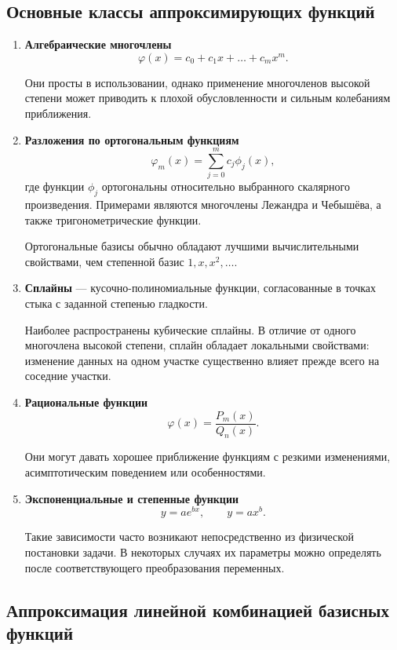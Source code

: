 \subsection{Основные классы аппроксимирующих функций}

\begin{enumerate}
	\item \textbf{Алгебраические многочлены}
	\[
	\varphi(x)
	=
	c_0+c_1x+\ldots+c_mx^m.
	\]
	
	Они просты в использовании, однако применение многочленов высокой степени может приводить к плохой обусловленности и сильным колебаниям приближения.
	
	\item \textbf{Разложения по ортогональным функциям}
	\[
	\varphi_m(x)
	=
	\sum_{j=0}^{m}c_j\phi_j(x),
	\]
	где функции $\phi_j$ ортогональны относительно выбранного скалярного произведения. Примерами являются многочлены Лежандра и Чебышёва, а также тригонометрические функции.
	
	Ортогональные базисы обычно обладают лучшими вычислительными свойствами, чем степенной базис $1,x,x^2,\ldots$.
	
	\item \textbf{Сплайны} --- кусочно-полиномиальные функции, согласованные в точках стыка с заданной степенью гладкости.
	
	Наиболее распространены кубические сплайны. В отличие от одного многочлена высокой степени, сплайн обладает локальными свойствами: изменение данных на одном участке существенно влияет прежде всего на соседние участки.
	
	\item \textbf{Рациональные функции}
	\[
	\varphi(x)=\frac{P_m(x)}{Q_n(x)}.
	\]
	
	Они могут давать хорошее приближение функциям с резкими изменениями, асимптотическим поведением или особенностями.
	
	\item \textbf{Экспоненциальные и степенные функции}
	\[
	y=ae^{bx},
	\qquad
	y=ax^b.
	\]
	
	Такие зависимости часто возникают непосредственно из физической постановки задачи. В некоторых случаях их параметры можно определять после соответствующего преобразования переменных.
\end{enumerate}

\subsection{Аппроксимация линейной комбинацией базисных функций}


